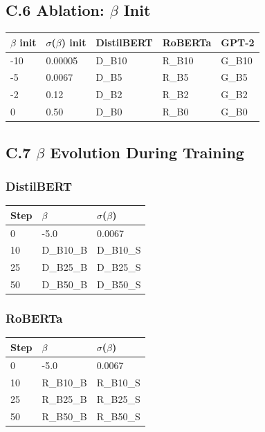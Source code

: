 \subsection{C.6 Ablation: $\beta$ Init}

\begin{table}[H]
\centering
\small
\begin{tabular}{lllll}
\toprule
\textbf{$\beta$ init} & \textbf{$\sigma$($\beta$) init} & \textbf{DistilBERT} & \textbf{RoBERTa} & \textbf{GPT-2} \\
\midrule
-10 & 0.00005 & {{D\_B10}} & {{R\_B10}} & {{G\_B10}} \\
-5 & 0.0067 & {{D\_B5}} & {{R\_B5}} & {{G\_B5}} \\
-2 & 0.12 & {{D\_B2}} & {{R\_B2}} & {{G\_B2}} \\
0 & 0.50 & {{D\_B0}} & {{R\_B0}} & {{G\_B0}} \\
\bottomrule
\end{tabular}
\end{table}

\subsection{C.7 $\beta$ Evolution During Training}

\subsubsection{DistilBERT}

\begin{table}[H]
\centering
\small
\begin{tabular}{lll}
\toprule
\textbf{Step} & \textbf{$\beta$} & \textbf{$\sigma$($\beta$)} \\
\midrule
0 & -5.0 & 0.0067 \\
10 & {{D\_B10\_B}} & {{D\_B10\_S}} \\
25 & {{D\_B25\_B}} & {{D\_B25\_S}} \\
50 & {{D\_B50\_B}} & {{D\_B50\_S}} \\
\bottomrule
\end{tabular}
\end{table}

\subsubsection{RoBERTa}

\begin{table}[H]
\centering
\small
\begin{tabular}{lll}
\toprule
\textbf{Step} & \textbf{$\beta$} & \textbf{$\sigma$($\beta$)} \\
\midrule
0 & -5.0 & 0.0067 \\
10 & {{R\_B10\_B}} & {{R\_B10\_S}} \\
25 & {{R\_B25\_B}} & {{R\_B25\_S}} \\
50 & {{R\_B50\_B}} & {{R\_B50\_S}} \\
\bottomrule
\end{tabular}
\end{table}

